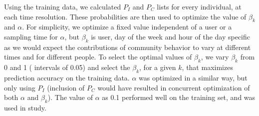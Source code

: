 Using the training data, we calculated $P_I$ and $P_C$ lists for every individual, at each time resolution. These probabilities are then used to optimize the value of $\beta_k$ and $\alpha$. For simplicity, we optimize a fixed value independent of a user or a sampling time for $\alpha$, but $\beta_k$ is user, day of the week and hour of the day specific as we would expect the contributions of community behavior to vary at different times and for different people. To select the optimal values of $\beta_k$, 
we vary $\beta_k$ from 0 and 1 ( intervals of 0.05) and select the $\beta_k$, for a given $k$, that maximizes prediction accuracy on the training data.
$\alpha$ was optimized in a similar way, but only using $P_I$ (inclusion of $P_C$ would have resulted in concurrent optimization of both $\alpha$ and $\beta_k$). The value of $\alpha$ as 0.1 performed well on the training set, and was used in study.


